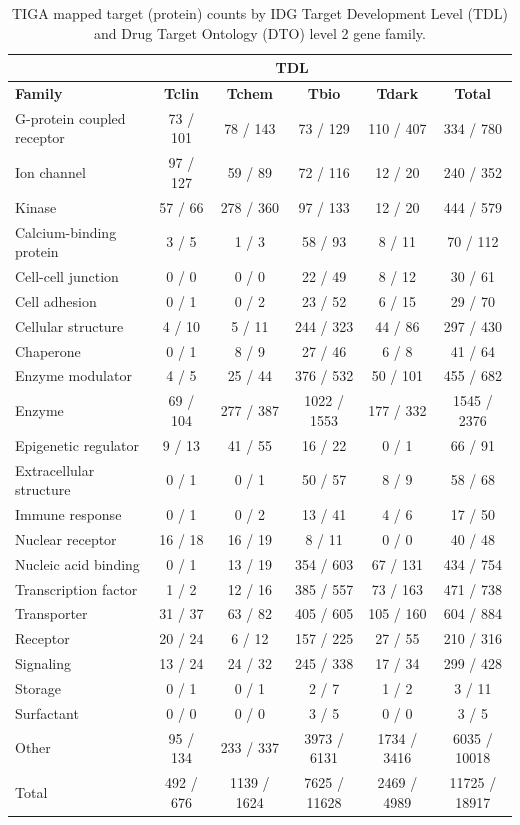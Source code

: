 \begin{table}
\caption{TIGA mapped target (protein) counts by IDG Target Development Level (TDL) and Drug Target Ontology (DTO) level 2 gene family.}
\begin{center}
\begin{tabular}{ |l|c|c|c|c|c| } 
\hline
 & \multicolumn{4}{|c|}{\textbf{TDL}} &  \\
\hline
\textbf{Family} & \textbf{Tclin} & \textbf{Tchem} & \textbf{Tbio} & \textbf{Tdark} & \textbf{Total} \\
\hline
G-protein coupled receptor & 73 / 101 & 78 / 143 & 73 / 129 & 110 / 407 & 334 / 780 \\
Ion channel & 97 / 127 & 59 / 89 & 72 / 116 & 12 / 20 & 240 / 352 \\
Kinase & 57 / 66 & 278 / 360 & 97 / 133 & 12 / 20 & 444 / 579 \\
Calcium-binding protein & 3 / 5 & 1 / 3 & 58 / 93 & 8 / 11 & 70 / 112 \\
Cell-cell junction & 0 / 0 & 0 / 0 & 22 / 49 & 8 / 12 & 30 / 61 \\
Cell adhesion & 0 / 1 & 0 / 2 & 23 / 52 & 6 / 15 & 29 / 70 \\
Cellular structure & 4 / 10 & 5 / 11 & 244 / 323 & 44 / 86 & 297 / 430 \\
Chaperone & 0 / 1 & 8 / 9 & 27 / 46 & 6 / 8 & 41 / 64 \\
Enzyme modulator & 4 / 5 & 25 / 44 & 376 / 532 & 50 / 101 & 455 / 682 \\
Enzyme & 69 / 104 & 277 / 387 & 1022 / 1553 & 177 / 332 & 1545 / 2376 \\
Epigenetic regulator & 9 / 13 & 41 / 55 & 16 / 22 & 0 / 1 & 66 / 91 \\
Extracellular structure & 0 / 1 & 0 / 1 & 50 / 57 & 8 / 9 & 58 / 68 \\
Immune response & 0 / 1 & 0 / 2 & 13 / 41 & 4 / 6 & 17 / 50 \\
Nuclear receptor & 16 / 18 & 16 / 19 & 8 / 11 & 0 / 0 & 40 / 48 \\
Nucleic acid binding & 0 / 1 & 13 / 19 & 354 / 603 & 67 / 131 & 434 / 754 \\
Transcription factor & 1 / 2 & 12 / 16 & 385 / 557 & 73 / 163 & 471 / 738 \\
Transporter & 31 / 37 & 63 / 82 & 405 / 605 & 105 / 160 & 604 / 884 \\
Receptor & 20 / 24 & 6 / 12 & 157 / 225 & 27 / 55 & 210 / 316 \\
Signaling & 13 / 24 & 24 / 32 & 245 / 338 & 17 / 34 & 299 / 428 \\
Storage & 0 / 1 & 0 / 1 & 2 / 7 & 1 / 2 & 3 / 11 \\
Surfactant & 0 / 0 & 0 / 0 & 3 / 5 & 0 / 0 & 3 / 5 \\
Other & 95 / 134 & 233 / 337 & 3973 / 6131 & 1734 / 3416 & 6035 / 10018 \\
\hline
Total & 492 / 676 & 1139 / 1624 & 7625 / 11628 & 2469 / 4989 & 11725 / 18917 \\
\hline
\end{tabular}
\end{center}
\label{table:idg_counts}
\end{table}

